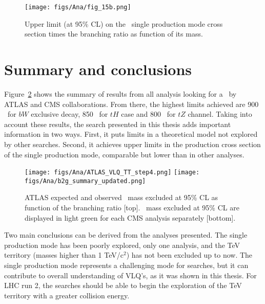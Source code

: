 \begin{figure}[!Hhtbp]
  \begin{center}
    \texttt{[image: figs/Ana/fig\_15b.png]}
    \caption{Upper limit (at 95\% CL) on the \Tp~single production mode cross section times the branching ratio as function of its mass.}
    \label{fig:SingleATLASres}
  \end{center}
\end{figure}

\section{Summary and conclusions}
\label{sec:SumCon}

Figure~\ref{fig:SummaryRes} shows the summary of results from all analysis looking for a \Tp~by ATLAS and CMS collaborations. From there, the highest limits achieved are 900 \GeVcc~for $bW$ exclusive decay, 850 \GeVcc~for $tH$ case and 800 \GeVcc~for $tZ$ channel. Taking into account these results, the search presented in this thesis adds important information in two ways. First, it puts limits in a theoretical model not explored by other searches. Second, it achieves upper limits in the production cross section of the single production mode, comparable but lower than in other analyses.

\begin{figure}[!Hhtbp]
  \begin{center}
    \texttt{[image: figs/Ana/ATLAS\_VLQ\_TT\_step4.png]}
    \texttt{[image: figs/Ana/b2g\_summary\_updated.png]}
    \caption{ATLAS expected and observed \Tp~mass excluded at 95\% CL as function of the branching ratio [top]. \Tp~mass excluded at 95\% CL are displayed in light green for each CMS analysis separately [bottom].}
    \label{fig:SummaryRes}
  \end{center}
\end{figure}

Two main conclusions can be derived from the analyses presented. The single production mode has been poorly explored, only one analysis, and the TeV territory (masses higher than 1 TeV/$\text{c}^{2}$) has not been excluded up to now. The single production mode represents a challenging mode for searches, but it can contribute to overall understanding of VLQ's, as it was shown in this thesis. For LHC run 2, the searches should be able to begin the exploration of the TeV territory with a greater collision energy. 